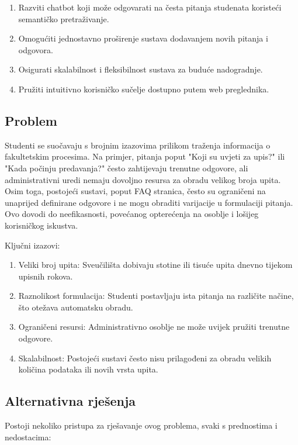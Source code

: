 \begin{enumerate}
    \item Razviti chatbot koji može odgovarati na česta pitanja studenata koristeći semantičko pretraživanje.
    \item Omogućiti jednostavno proširenje sustava dodavanjem novih pitanja i odgovora.
    \item Osigurati skalabilnost i fleksibilnost sustava za buduće nadogradnje.
    \item Pružiti intuitivno korisničko sučelje dostupno putem web preglednika.
\end{enumerate}

\subsection{Problem}
Studenti se suočavaju s brojnim izazovima prilikom traženja informacija o fakultetskim procesima. Na primjer, pitanja poput "Koji su uvjeti za upis?" ili "Kada počinju predavanja?" često zahtijevaju trenutne odgovore, ali administrativni uredi nemaju dovoljno resursa za obradu velikog broja upita. Osim toga, postojeći sustavi, poput FAQ stranica, često su ograničeni na unaprijed definirane odgovore i ne mogu obraditi varijacije u formulaciji pitanja. Ovo dovodi do neefikasnosti, povećanog opterećenja na osoblje i lošijeg korisničkog iskustva.

Ključni izazovi:
\begin{enumerate}
    \item Veliki broj upita: Sveučilišta dobivaju stotine ili tisuće upita dnevno tijekom upisnih rokova.
    \item Raznolikost formulacija: Studenti postavljaju ista pitanja na različite načine, što otežava automatsku obradu.
    \item Ograničeni resursi: Administrativno osoblje ne može uvijek pružiti trenutne odgovore.
    \item Skalabilnost: Postojeći sustavi često nisu prilagođeni za obradu velikih količina podataka ili novih vrsta upita.
\end{enumerate}

\subsection{Alternativna rješenja}

Postoji nekoliko pristupa za rješavanje ovog problema, svaki s prednostima i nedostacima:

